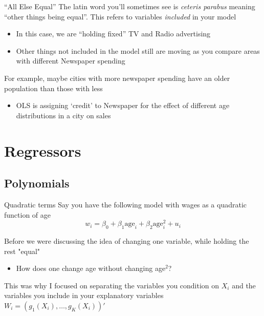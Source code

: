 \documentclass[aspectratio=169,t,11pt,table]{beamer}
\begin{document}
\begin{frame}{``All Else Equal''}
  The latin word you'll sometimes see is \emph{ceteris parabus} meaning ``other things being equal''.
  This refers to variables \emph{included} in your model
  \begin{itemize}
    \item In this case, we are ``holding fixed'' TV and Radio advertising
    
    \item Other things not included in the model still are moving as you compare areas with different Newspaper spending 
  \end{itemize}

  \bigskip
  For example, maybe cities with more newspaper spending have an older population than those with less
  \begin{itemize}
    \item OLS is assigning `credit' to Newspaper for the effect of different age distributions in a city on sales
  \end{itemize}
\end{frame}


\section{Regressors}

\subsection{Polynomials}

\begin{frame}{Quadratic terms}
  Say you have the following model with wages as a quadratic function of age
  $$
    w_i = \beta_0 + \beta_1 \text{age}_i + \beta_2 \text{age}_i^2 + u_i
  $$

  \bigskip
  Before we were discussing the idea of changing one variable, while holding the rest "equal"
  \begin{itemize}
    \item How does one change age without changing age$^2$?
  \end{itemize}

  \bigskip
  This was why I focused on separating the variables you condition on $X_i$ and the variables you include in your explanatory variables $W_i = \left( g_1(X_i), \dots, g_K(X_i) \right)'$
\end{frame}
\end{document}
